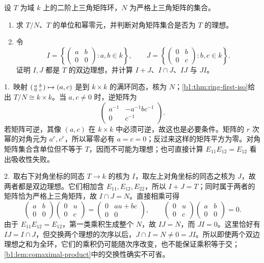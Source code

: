 \begin{exercise}\label{b1:ex:10-triangular}
	设 \(T\) 为域 \(k\) 上的二阶上三角矩阵环，\(N\) 为严格上三角矩阵的集合。
	\begin{enumerate}
		\item 求 \(T/N\)、\(T\) 的单位和幂零元，并判断对角矩阵集合是否为 \(T\) 的理想。
		\item 令
			\[
				I=\left\{\begin{pmatrix}a&b\\0&0\end{pmatrix}:a,b\in k\right\},
				\qquad
				J=\left\{\begin{pmatrix}0&b\\0&c\end{pmatrix}:b,c\in k\right\}.
			\]
			证明 \(I,J\) 都是 \(T\) 的双边理想，并计算 \(I+J\)、\(I\cap J\)、\(IJ\) 与 \(JI\)。
	\end{enumerate}
\end{exercise}
\begin{solution}
	1.\ 映射
	\(\begin{psmallmatrix}a&b\\0&c\end{psmallmatrix}\mapsto(a,c)\)
	是到 \(k\times k\) 的满环同态，核为 \(N\)；\cref{b1:thm:ring-first-iso}给出 \(T/N\cong k\times k\)。当 \(a,c\ne0\) 时，逆矩阵为
	\[
		\begin{pmatrix}a^{-1}&-a^{-1}bc^{-1}\\0&c^{-1}\end{pmatrix}.
	\]
	若矩阵可逆，其像 \((a,c)\) 在 \(k\times k\) 中必须可逆，故这也是必要条件。矩阵的 \(r\) 次幂的对角元为 \(a^r,c^r\)，所以幂零必有 \(a=c=0\)；反过来这样的矩阵平方为零。对角矩阵集合含单位但不等于 \(T\)，因而不可能为理想；也可直接计算 \(E_{11}E_{12}=E_{12}\) 看出吸收性失败。

	2.\ 取右下对角坐标的同态 \(T\to k\) 的核为 \(I\)，取左上对角坐标的同态之核为 \(J\)，故两者都是双边理想。它们相加含 \(E_{11},E_{12},E_{22}\)，所以 \(I+J=T\)；同时属于两者的矩阵恰为严格上三角矩阵，故 \(I\cap J=N\)。直接相乘可得
	\[
		\begin{pmatrix}a&b\\0&0\end{pmatrix}
		\begin{pmatrix}0&u\\0&c\end{pmatrix}
		=\begin{pmatrix}0&au+bc\\0&0\end{pmatrix},
		\qquad
		\begin{pmatrix}0&u\\0&c\end{pmatrix}
		\begin{pmatrix}a&b\\0&0\end{pmatrix}=0.
	\]
	由于 \(E_{11}E_{12}=E_{12}\)，第一类乘积生成整个 \(N\)，故 \(IJ=N\)，而 \(JI=0\)。这里恰好有 \(IJ=I\cap J\)，但交换两个理想的次序以后，\(J\cap I=N\ne0=JI\)。所以即使两个双边理想之和为全环，它们的乘积仍可能随次序改变，也不能保证乘积等于交；\cref{b1:lem:comaximal-product}中的交换性确实不可省。
\end{solution}


